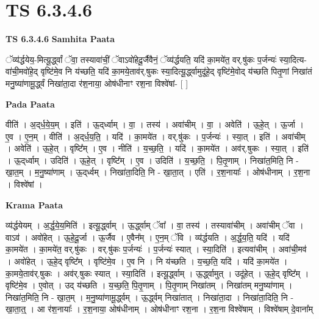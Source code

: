 \documentclass[17pt]{extarticle}
\begin{document}
\section{ TS 6.3.4.6 }

\textbf{TS 6.3.4.6 } \newline
\textbf{Samhita Paata} \newline

ॅव्य॑र्द्धयेय॒-मित्यू॒र्द्ध्वां ॅवा॒ तस्यावा॑चीं॒ ॅवाऽवो॑हेदू॒र्जैवैनं॒ ॅव्य॑र्द्धयति॒ यदि॑ का॒मये॑त॒ वर्.षु॑कः प॒र्जन्यः॑ स्या॒दित्य-वा॑ची॒मवो॑हे॒द् वृष्टि॑मे॒व नि य॑च्छति॒ यदि॑ का॒मये॒ताव॑र्.षुकः स्या॒दित्यू॒र्द्ध्वामुदू॑हे॒द् वृष्टि॑मे॒वोद् य॑च्छति पितृ॒णां निखा॑तं मनु॒ष्या॑णामू॒र्द्ध्वं निखा॑ता॒दा र॑श॒नाया॒ ओष॑धीनाꣳ रश॒ना विश्वे॑षां- [  ] \newline

\textbf{Pada Paata} \newline

वीति॑ । अ॒द्‌र्ध॒ये॒य॒म् । इति॑ । ऊ॒द्‌र्ध्वाम् । वा॒ । तस्य॑ । अवा॑चीम् । वा॒ । अवेति॑ । ऊ॒हे॒त् । ऊ॒र्जा । ए॒व । ए॒न॒म् । वीति॑ । अ॒द्‌र्ध॒य॒ति॒ । यदि॑ । का॒मये॑त । वर्.षु॑कः । प॒र्जन्यः॑ । स्या॒त् । इति॑ । अवा॑चीम् । अवेति॑ । ऊ॒हे॒त् । वृष्टि᳚म् । ए॒व । नीति॑ । य॒च्छ॒ति॒ । यदि॑ । का॒मये॑त । अव॑र्.षुकः । स्या॒त् । इति॑ । ऊ॒द्‌र्ध्वाम् । उदिति॑ । ऊ॒हे॒त् । वृष्टि᳚म् । ए॒व । उदिति॑ । य॒च्छ॒ति॒ । पि॒तृ॒णाम् । निखा॑त॒मिति॒ नि - खा॒त॒म् । म॒नु॒ष्या॑णाम् । ऊ॒द्‌र्ध्वम् । निखा॑ता॒दिति॒ नि - खा॒ता॒त् । एति॑ । र॒श॒नायाः᳚ । ओष॑धीनाम् । र॒श॒ना । विश्वे॑षां ।  \newline


\textbf{Krama Paata} \newline

व्य॑र्द्धयेयम् । अ॒र्द्ध॒ये॒य॒मिति॑ । इत्यू॒र्द्ध्वाम् । ऊ॒र्द्ध्वाम् ॅवा᳚ । वा॒ तस्य॑ । तस्यावा॑चीम् । अवा॑चीम् ॅवा । वाऽव॑ । अवो॑हेत् । ऊ॒हे॒दू॒र्जा । ऊ॒र्जैव । ए॒वैन᳚म् । ए॒न॒म् ॅवि । व्य॑र्द्धयति । अ॒र्द्ध॒य॒ति॒ यदि॑ । यदि॑ का॒मये॑त । का॒मये॑त॒ वर्.षु॑कः । वर्.षु॑कः प॒र्जन्यः॑ । प॒र्जन्यः॑ स्यात् । स्या॒दिति॑ । इत्यवा॑चीम् । अवा॑ची॒मव॑ । अवो॑हेत् । ऊ॒हे॒द् वृष्टि᳚म् । वृष्टि॑मे॒व । ए॒व नि । नि य॑च्छति । य॒च्छ॒ति॒ यदि॑ । यदि॑ का॒मये॑त । का॒मये॒ताव॑र्.षुकः । अव॑र्.षुकः स्यात् । स्या॒दिति॑ । इत्यू॒र्द्ध्वाम् । ऊ॒र्द्ध्वामुत् । उदू॑हेत् । ऊ॒हे॒द् वृष्टि᳚म् । वृष्टि॑मे॒व । ए॒वोत् । उद् य॑च्छति । य॒च्छ॒ति॒ पि॒तृ॒णाम् । पि॒तृ॒णाम् निखा॑तम् । निखा॑तम् मनु॒ष्या॑णाम् । निखा॑त॒मिति॒ नि - खा॒त॒म् । म॒नु॒ष्या॑णामू॒र्द्ध्वम् । ऊ॒र्द्ध्वम् निखा॑तात् । निखा॑ता॒दा । निखा॑ता॒दिति॒ नि - खा॒ता॒त्॒ । आ र॑श॒नायाः᳚ । र॒श॒नाया॒ ओष॑धीनाम् । ओष॑धीनाꣳ रश॒ना । र॒श॒ना विश्वे॑षाम् । विश्वे॑षाम् दे॒वाना᳚म् \newline
\end{document}
